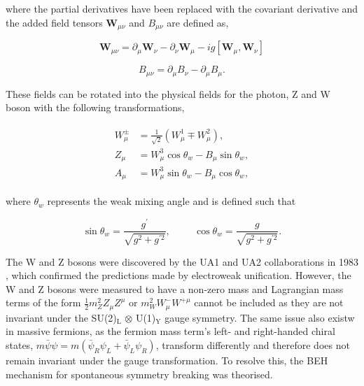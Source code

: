 where the partial derivatives have been replaced with the covariant derivative and the added field tensors $\boldsymbol{W}_{\mu\nu}$ and $B_{\mu\nu}$ are defined as,

\begin{equation}
\boldsymbol{W}_{\mu\nu} = \partial_{\mu} \boldsymbol{W}_{\nu} - \partial_{\nu} \boldsymbol{W}_{\mu} - ig[\boldsymbol{W}_{\mu},\boldsymbol{W}_{\nu}]
\end{equation}

\begin{equation}
B_{\mu\nu} = \partial_{\mu} B_{\nu} - \partial_{\mu} B_{\mu}.
\end{equation}

These fields can be rotated into the physical fields for the photon, Z and W boson with the following transformations,

\begin{align}
\begin{split}
W^{\pm}_{\mu} &= \frac{1}{\sqrt{2}}(W^{1}_{\mu} \mp W^{2}_{\mu}), \\
Z_{\mu} &= W^{3}_{\mu} \cos\theta_{w} - B_{\mu} \sin\theta_w, \\
A_{\mu} &= W^{3}_{\mu} \sin\theta_{w} - B_{\mu} \cos\theta_w,
\end{split}
\label{eqn:rotations}
\end{align}

where $\theta_w$ represents the weak mixing angle and is defined such that

\begin{equation}
\sin\theta_w = \frac{g^{\prime}}{\sqrt{g^2 + g^{\prime 2}}}, \hspace{1cm} \cos\theta_w = \frac{g}{\sqrt{g^2 + g^{\prime 2}}}.
\end{equation}

The W and Z bosons were discovered by the UA1 and UA2 collaborations in 1983 \cite{UA1:1983crd,UA2:1983tsx}, which confirmed the predictions made by electroweak unification.
However, the W and Z bosons were measured to have a non-zero mass and Lagrangian mass terms of the form $\frac{1}{2}m_{Z}^2 Z_{\mu} Z^{\mu}$ or $m_{W}^2 W_{\mu}^{-}W^{+\mu}$ cannot be included as they are not invariant under the SU(2)$_{\text{L}}$ $\otimes$ U(1)$_{\text{Y}}$ gauge symmetry.
The same issue also existw in massive fermions, as the fermion mass term's left- and right-handed chiral states, $m\bar{\psi}\psi = m(\bar{\psi}_R \psi_L + \bar{\psi}_L \psi_R)$,  transform differently and therefore does not remain invariant under the gauge transformation.
To resolve this, the \ac{BEH} mechanism for spontaneous symmetry breaking was theorised.

